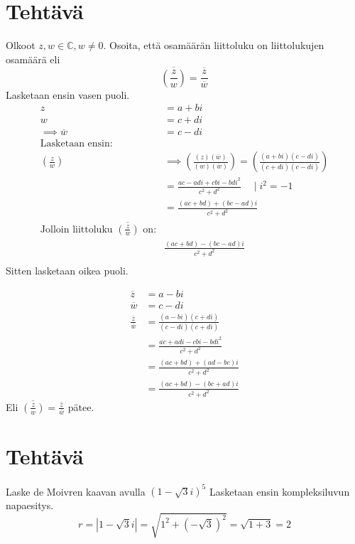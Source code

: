 \documentclass{article}
\newcounter{tehtava}
\begin{document}
\newpage
{}
\section*{Tehtävä \thetehtava}
Olkoot $z, w \in \mathbb{C}, w \neq 0$. Osoita, että osamäärän liittoluku on liittolukujen osamäärä eli
\[
    \overline{\left(\frac{z}{w}\right)} = \frac{\overline{z}}{\overline{w}}
\]
Lasketaan ensin vasen puoli.
\[
    \begin{aligned}
        z &= a + bi \\
        w &= c + di \\
        \implies \overline{w} &= c - di \\[10pt]
        \text{Lasketaan ensin:} \\
        \left(\frac{z}{w}\right) &\implies\left(\frac{(z)(\overline{w})}{(w)(\overline{w})}\right) = \left(\frac{(a + bi)(c -di)}{(c + di)(c - di)}\right) \\
        &= \frac{ac - adi + cbi - bdi^2}{c^2 + d^2} \quad \mid i^2 = -1 \\
        &= \frac{(ac + bd) + (bc - ad)i}{c^2 + d^2} \\
        \text{Jolloin liittoluku } \overline{\left(\frac{z}{w}\right)} \text{ on:}\\
        &\frac{(ac + bd) - (bc - ad)i}{c^2 + d^2} \\
    \end{aligned}
 \]
Sitten lasketaan oikea puoli.


\[
    \begin{aligned}
        \overline{z} &= a - bi\\
        \overline{w} &= c - di\\[10pt]
        \frac{\overline{z}}{\overline{w}} &= \frac{(a - bi)(c + di)}{(c - di)(c + di)}\\
        &= \frac{ac +adi -cbi -bdi^2}{c^2 + d^2}\\
        &= \frac{(ac + bd)  + (ad -bc)i }{c^2 + d^2}\\
        &= \frac{(ac + bd)  - (bc + ad)i }{c^2 + d^2}
    \end{aligned}
\]
Eli $\overline{\left(\frac{z}{w}\right)} = \frac{\overline{z}}{\overline{w}}$ pätee.


\newpage
{}
\section*{Tehtävä \thetehtava}
Laske de Moivren kaavan avulla $(1 - \sqrt{3}i)^5$\newline
Lasketaan ensin kompleksiluvun napaesitys.
\[
    r = |1 - \sqrt{3}i| = \sqrt{1^2 + (-\sqrt{3})^2} = \sqrt{1 + 3} = 2
\]
\end{document}
